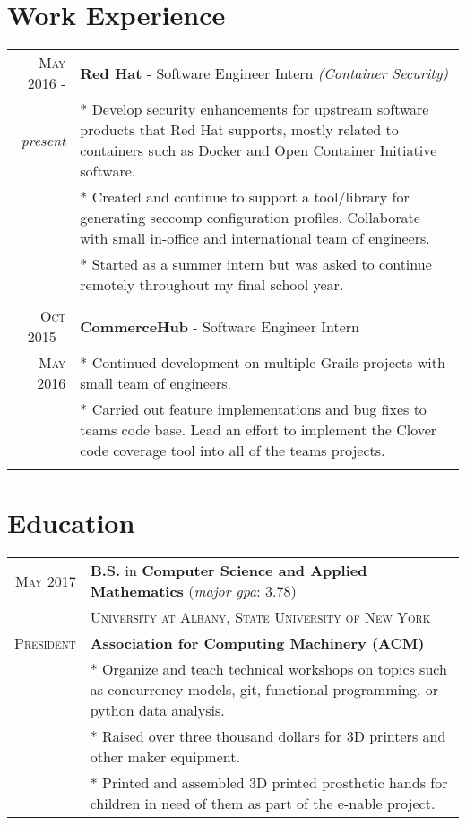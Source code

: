 \documentclass[a4paper,10pt]{article}
\begin{document}
\section{Work Experience}
\begin{tabular}{rp{11cm}}


 \textsc{May 2016 -} & \textbf{Red Hat} - Software Engineer Intern \textit{(Container Security)} \\\emph{present}&\footnotesize{* Develop security enhancements for upstream software products that Red Hat supports, mostly related to containers such as Docker and Open Container Initiative software.}\\
 &\footnotesize{* Created and continue to support a tool/library for generating seccomp configuration profiles. Collaborate with small in-office and international team of engineers.}\\
 &\footnotesize{* Started as a summer intern but was asked to continue remotely throughout my final school year.}
 \\\multicolumn{2}{c}{} \\
 
  \textsc{Oct 2015 -} & \textbf{CommerceHub} - Software Engineer Intern 
  \\\textsc{May 2016}
 &\footnotesize{* Continued development on multiple Grails projects with small team of engineers.}\\
 &\footnotesize{* Carried out feature implementations and bug fixes to teams code base. Lead an effort to implement the Clover code coverage tool into all of the teams projects.}\\
 \multicolumn{2}{c}{} 

\end{tabular}


\section{Education}
\begin{tabular}{rp{11cm}}
 \textsc{May} 2017 & \textbf{B.S.} in \textbf{Computer Science and Applied Mathematics}  (\textit{major gpa}: 3.78)\\
& \textsc{University at Albany, State University of New York}\\

\textsc{President}& \textbf{Association for Computing Machinery (ACM)}\\
&\footnotesize{* Organize and teach technical workshops on topics such as concurrency models, git, functional programming, or python data analysis.}\\
&\footnotesize{* Raised over three thousand dollars for 3D printers and other maker equipment.}\\
&\footnotesize{* Printed and assembled 3D printed prosthetic hands for children in need of them as part of the e-nable project.}\\
\end{tabular}
\end{document}
